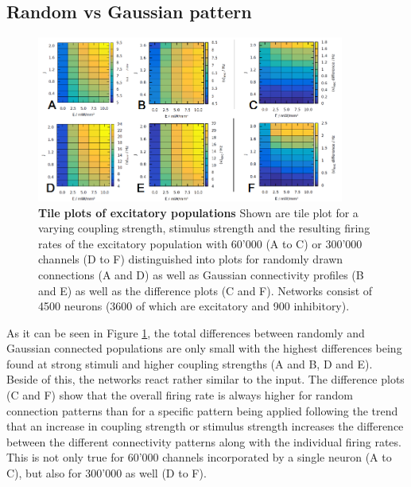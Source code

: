 \documentclass[14pt]{SelfArx} %
\numberwithin{equation}{section}
\begin{document}
\subsection{Random vs Gaussian pattern}
\begin{figure} [htp]
\centering
\includegraphics[width = 0.9\textwidth]{ex_tileplot.png}
\caption{\textbf{Tile plots of excitatory populations} Shown are tile plot for a varying coupling strength, stimulus strength and the resulting firing rates of the excitatory population with 60'000 (A to C) or 300'000 channels (D to F) distinguished into plots for randomly drawn connections (A and D) as well as Gaussian connectivity profiles (B and E) as well as the difference plots (C and F). Networks consist of 4500 neurons (3600 of which are excitatory and 900 inhibitory).}
\label{fig:tileplotex}
\end{figure}
As it can be seen in Figure \ref{fig:tileplotex}, the total differences between randomly and Gaussian connected populations are only small with the highest differences being found at strong stimuli and higher coupling strengths (A and B, D and E). Beside of this, the networks react rather similar to the input. The difference plots (C and F) show that the overall firing rate is always higher for random connection patterns than for a specific pattern being applied following the trend that an increase in coupling strength or stimulus strength increases the difference between the different connectivity patterns along with the individual firing rates. \newline
This is not only true for 60'000 channels incorporated by a single neuron (A to C), but also for 300'000 as well (D to F).\newline
\end{document}
